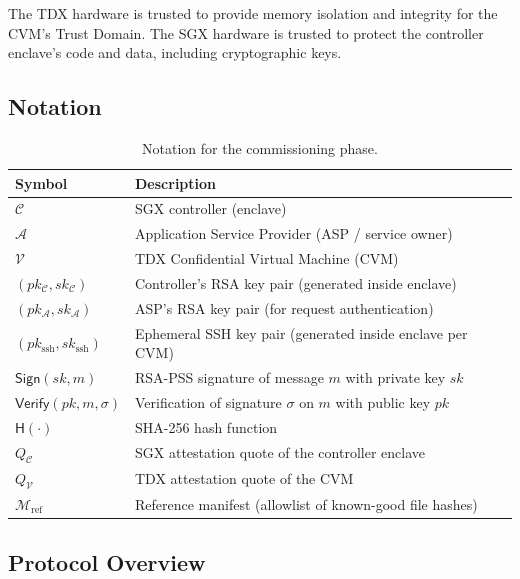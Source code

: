 The TDX hardware is trusted to provide memory isolation and integrity for the CVM's Trust Domain. The SGX hardware is trusted to protect the controller enclave's code and data, including cryptographic keys.

\subsection{Notation}
\label{sec:commissioning:notation}

\begin{table}[h]
\centering
\begin{tabular}{@{}ll@{}}
\toprule
\textbf{Symbol} & \textbf{Description} \\
\midrule
$\mathcal{C}$ & SGX controller (enclave) \\
$\mathcal{A}$ & Application Service Provider (ASP / service owner) \\
$\mathcal{V}$ & TDX Confidential Virtual Machine (CVM) \\
$(pk_\mathcal{C}, sk_\mathcal{C})$ & Controller's RSA key pair (generated inside enclave) \\
$(pk_\mathcal{A}, sk_\mathcal{A})$ & ASP's RSA key pair (for request authentication) \\
$(pk_{\text{ssh}}, sk_{\text{ssh}})$ & Ephemeral SSH key pair (generated inside enclave per CVM) \\
$\textsf{Sign}(sk, m)$ & RSA-PSS signature of message $m$ with private key $sk$ \\
$\textsf{Verify}(pk, m, \sigma)$ & Verification of signature $\sigma$ on $m$ with public key $pk$ \\
$\textsf{H}(\cdot)$ & SHA-256 hash function \\
$Q_\mathcal{C}$ & SGX attestation quote of the controller enclave \\
$Q_\mathcal{V}$ & TDX attestation quote of the CVM \\
$\mathcal{M}_{\text{ref}}$ & Reference manifest (allowlist of known-good file hashes) \\
\bottomrule
\end{tabular}
\caption{Notation for the commissioning phase.}
\label{tab:notation}
\end{table}

\subsection{Protocol Overview}
\label{sec:commissioning:overview}

